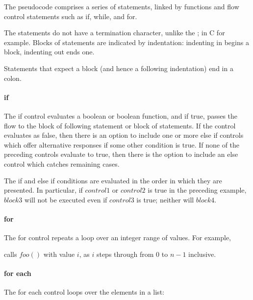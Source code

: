 The pseudocode comprises a series of statements, linked by functions and
flow control statements such as if, while, and for.

The statements do not have a termination character, unlike the ; in C
for example.  Blocks of statements are indicated by indentation:
indenting in begins a block, indenting out ends one.

Statements that expect a block (and hence a following indentation) end
in a colon.

\paragraph*{if}

The if control evaluates a boolean or boolean function, and if true, passes the 
flow to the block of following statement or block of statements. If the control
evaluates as false, then there is an option to include one or more else if
controls which offer alternative responses if some other condition is
true.  If none of the preceding controls evaluate to true, then there is
the option to include an else control which catches remaining cases.

\begin{pseudo*}
\bsELSE
\bsEND
\end{pseudo*}

The if and else if conditions are evaluated in the order in which they
are presented. In particular, if $control1$ or $control2$ is true in
the preceding example, $block3$ will not be executed
even if $control3$ is true; neither will $block4$.

\paragraph*{for}

The for control repeats a loop over an integer range of values. For example,

\begin{pseudo*}
\bsEND
\end{pseudo*}

calls $foo()$ with value $i$, as $i$ steps through from 0 to $n-1$ inclusive.


\paragraph*{for each} The for each control loops over the elements in
a list:

